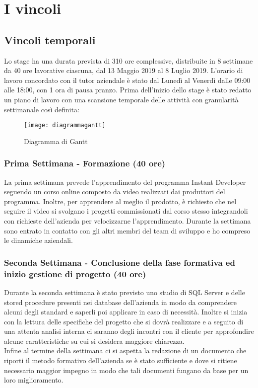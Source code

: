 \section{I vincoli}
\subsection{Vincoli temporali}
Lo stage ha una durata prevista di 310 ore complessive, distribuite in 8 settimane da 40 ore lavorative ciascuna, dal 13 Maggio 2019 al 8 Luglio 2019. L'orario di lavoro concordato con il tutor aziendale è stato dal Lunedì al Venerdì dalle 09:00 alle 18:00, con 1 ora di pausa pranzo. Prima dell'inizio dello stage è stato redatto un piano di lavoro con una scansione temporale delle attività con granularità settimanale così definita:


\begin{figure}[!h] 
	\centering 
	\texttt{[image: diagrammagantt]} 
	\caption{Diagramma di Gantt}
	\label{Gantt}
\end{figure}


\subsubsection*{Prima Settimana - Formazione (40 ore)}
La prima settimana prevede l'apprendimento del programma Instant Developer seguendo un corso online composto da video realizzati dai produttori del programma. Inoltre, per apprendere al meglio il prodotto, è richiesto che nel seguire il video si svolgano i progetti commissionati dal corso stesso integrandoli con richieste dell'azienda per velocizzarne l'apprendimento. 
Durante la settimana sono entrato in contatto con gli altri membri del team di sviluppo e ho compreso le dinamiche aziendali.

\subsubsection*{Seconda Settimana - Conclusione della fase formativa ed inizio gestione di progetto (40 ore)}
Durante la seconda settimana è stato previsto uno studio di SQL Server e delle stored procedure presenti nei database dell'azienda in modo da comprendere alcuni degli standard e saperli poi applicare in caso di necessità. Inoltre si inizia con la lettura delle specifiche del progetto che si dovrà realizzare e a seguito di una attenta analisi interna ci saranno degli incontri con il cliente per approfondire alcune caratteristiche su cui si desidera maggiore chiarezza. \\
Infine al termine della settimana ci si aspetta la redazione di un documento che riporti il metodo formativo dell'azienda se è stato sufficiente e dove si ritiene necessario maggior impegno in modo che tali documenti fungano da base per un loro miglioramento.

